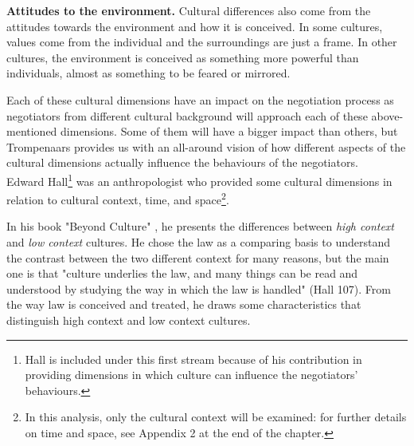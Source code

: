 \documentclass[../main.tex]{subfiles}
\begin{document}
\textbf{Attitudes to the environment.} Cultural differences also come from the attitudes towards the environment and how it is conceived. In some cultures, values come from the individual and the surroundings are just a frame. In other cultures, the environment is conceived as something more powerful than individuals, almost as something to be feared or mirrored.

Each of these cultural dimensions have an impact on the negotiation process as negotiators from different cultural background will approach each of these above-mentioned dimensions. Some of them will have a bigger impact than others, but Trompenaars provides us with an all-around vision of how different aspects of the cultural dimensions actually influence the behaviours of the negotiators.\\

Edward Hall\footnote{Hall is included under this first stream because of his contribution in providing dimensions in which culture can influence the negotiators' behaviours.} was an anthropologist who provided some cultural dimensions in relation to cultural context, time, and space\footnote{In this analysis, only the cultural context will be examined: for further details on time and space, see Appendix 2 at the end of the chapter.}. 

In his book "Beyond Culture" \cite{hall1}, he presents the differences between \textit{high context} and \textit{low context} cultures. He chose the law as a comparing basis to understand the contrast between the two different context for many reasons, but the main one is that "culture underlies the law, and many things can be read and understood by studying the way in which the law is handled" (Hall 107). From the way law is conceived and treated, he draws some characteristics that distinguish high context and low context cultures.
\end{document}
